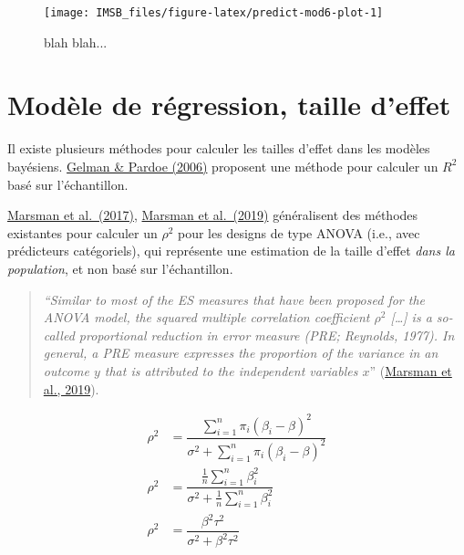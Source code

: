 \documentclass[
  a4paper,11pt,twoside,onecolumn,openright,final,oldfontcommands]{memoir}
\theoremstyle{definition}
\theoremstyle{definition}
\theoremstyle{definition}
\theoremstyle{definition}
\theoremstyle{remark}
\begin{document}
\begin{figure}[!htb]

{\centering \texttt{[image: IMSB\_files/figure-latex/predict-mod6-plot-1]} 

}

\caption{blah blah...}\label{fig:predict-mod6-plot}
\end{figure}

\hypertarget{moduxe8le-de-ruxe9gression-taille-deffet}{%
\section{Modèle de régression, taille d'effet}\label{moduxe8le-de-ruxe9gression-taille-deffet}}

Il existe plusieurs méthodes pour calculer les tailles d'effet dans les modèles bayésiens. \href{http://www.stat.columbia.edu/~gelman/research/published/rsquared.pdf}{Gelman \& Pardoe (2006)} proposent une méthode pour calculer un \(R^{2}\) basé sur l'échantillon.

\href{http://rsos.royalsocietypublishing.org/content/4/1/160426}{Marsman et al.~(2017)}, \href{https://onlinelibrary.wiley.com/doi/full/10.1111/stan.12173}{Marsman et al.~(2019)} généralisent des méthodes existantes pour calculer un \(\rho^{2}\) pour les designs de type ANOVA (i.e., avec prédicteurs catégoriels), qui représente une estimation de la taille d'effet \emph{dans la population}, et non basé sur l'échantillon.

\begin{quote}
\emph{``Similar to most of the ES measures that have been proposed for the ANOVA model, the squared multiple correlation coefficient \(\rho^{2}\) {[}\ldots{]} is a so-called proportional reduction in error measure (PRE; Reynolds, 1977). In general, a PRE measure expresses the proportion of the variance in an outcome \(y\) that is attributed to the independent variables \(x\)}'' (\href{https://onlinelibrary.wiley.com/doi/full/10.1111/stan.12173}{Marsman et al., 2019}).
\end{quote}

\[
\begin{aligned}
\rho^{2} &= \dfrac{\sum_{i = 1}^{n} \pi_{i}(\beta_{i} - \beta)^{2}}{\sigma^{2} + \sum_{i=1}^{n} \pi_{i}(\beta_{i} - \beta)^{2}} \\  \rho^{2} &= \dfrac{ \frac{1}{n} \sum_{i=1}^{n} \beta_{i}^{2}}{\sigma^{2} + \frac{1}{n} \sum_{i = 1}^{n} \beta_{i}^{2}} \\ \rho^{2} &= \dfrac{\beta^{2} \tau^{2}}{\sigma^{2} + \beta^{2} \tau^{2}}\\
\end{aligned}
\]
\end{document}
